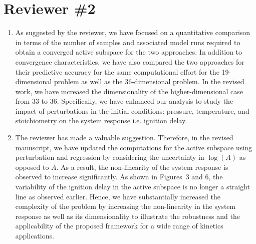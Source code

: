 \documentclass[11pt,final]{article}
\newcommand{\referee}[1]{\vspace{.1ex}\noindent{\textcolor{blue}{#1}}}
\begin{document}
\section*{Reviewer \#2}

\begin{enumerate}[wide, labelwidth=!, labelindent=0pt]
\item \referee{There is a lack of quantitative discussion of the expense of regression-vs-perturbation,
in terms of the actual number of model simulations required. The work seems to suggest that perturbation
works better than regression, but then it is a direct and clear consequence of the fact that local 
approximation is supposed to be better than a global one. Ideally, much more quantitative comparison
needs to be made here before reaching any meaningful conclusions.}

\noindent  As suggested by the reviewer, we have focused on a quantitative comparison in terms of the
number of samples and associated model runs required to obtain a converged active subspace
for the two approaches. In addition to convergence characteristics, we have also compared
the two approaches for their predictive accuracy for the same computational effort for the
19-dimensional problem as well as the 36-dimensional problem. In the revised work,
we have increased the dimensionality of
the higher-dimensional case from 33 to 36. Specifically, we have enhanced our analysis
to study the impact of perturbations in the initial conditions: pressure, temperature, and
stoichiometry on the system response i.e. ignition delay.

\item \referee{Another fundamental flaw is related to the additive treatment of the uncertainty of 
the pre-exponential factor A. In most works dealing with uncertainty in chemical kinetics, the
uncertainty form is multiplicative or, equivalently, log(A) is the underlying fundamental parameter 
with additive uncertainty range. In the current form of the uncertainty, the problem is too benign,
and barely carries any practical usability for the practitioners.}

\noindent The reviewer has made a valuable suggestion. Therefore, in the revised manuscript, we have
updated the computations for the active subspace using perturbation and regression by considering
the uncertainty in $\log(A)$ as opposed to $A$. As a result, the non-linearity of the system
response is observed to increase significantly. As shown in Figures~3 and 6, 
the variability of the ignition delay in the
active subspace is no longer a straight line as observed earlier. Hence, we have substantially
increased the complexity of the problem by increasing the non-linearity in the system response
as well as its dimensionality to illustrate the robustness and the applicability of the proposed framework
for a wide range of kinetics applications. 


\end{enumerate}
\end{document}
